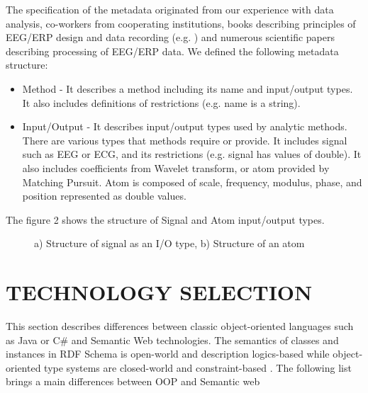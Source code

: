 \documentclass[a4paper,twoside]{article}
\begin{document}
The specification of the metadata originated from our experience
with data analysis, co-workers from cooperating institutions,
books describing principles of EEG/ERP design and data
recording (e.g. \cite{Luck05}) and numerous scientific papers describing
processing of EEG/ERP data. We defined the following metadata structure:
\begin{itemize}
	\item Method - It describes a method including its name and input/output types. It also includes definitions of restrictions (e.g. name is a string).
	
	\item Input/Output - It describes input/output types used by analytic methods. There are various types that methods require or provide. It includes signal such as EEG or ECG, and its restrictions (e.g. signal has values of double). It also includes coefficients from Wavelet transform, or atom provided by Matching Pursuit. Atom is composed of scale, frequency, modulus, phase, and position represented as double values.
	
\end{itemize}

The figure 2 shows the structure of Signal and Atom input/output types.

\begin{figure}[!h]

  \centering
   {}
  \caption{a) Structure of signal as an I/O type, b) Structure of an atom }
  \label{fig:SignalAndAtom}
 \end{figure}

\section{\uppercase{Technology Selection}}

\noindent This section describes differences between classic object-oriented languages such as Java or C\# and Semantic Web technologies. The semantics of classes and instances in RDF Schema is open-world and description logics-based while object-oriented type systems are closed-world and constraint-based \cite{Kalyanpur02}. The following list brings a main differences between OOP and Semantic web \cite{Oren07}
\end{document}
